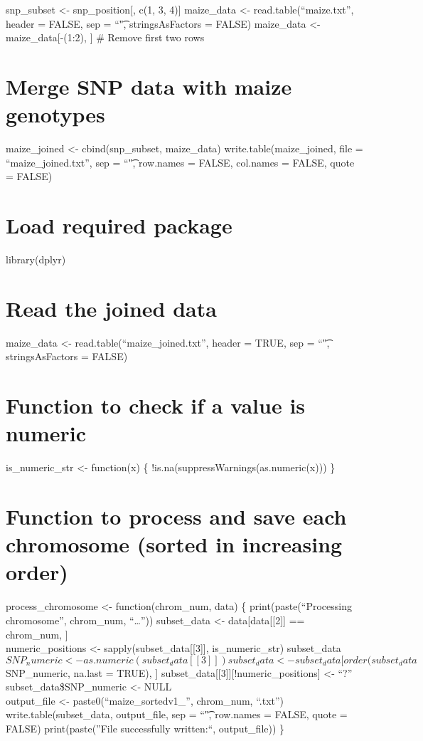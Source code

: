 \documentclass[
]{article}
\begin{document}
snp\_subset \textless- snp\_position{[}, c(1, 3, 4){]} maize\_data
\textless- read.table(``maize.txt'', header = FALSE, sep = ``\t",
stringsAsFactors = FALSE) maize\_data \textless- maize\_data{[}-(1:2),
{]} \# Remove first two rows

\section{Merge SNP data with maize
genotypes}\label{merge-snp-data-with-maize-genotypes}

maize\_joined \textless- cbind(snp\_subset, maize\_data)
write.table(maize\_joined, file = ``maize\_joined.txt'', sep = ``\t",
row.names = FALSE, col.names = FALSE, quote = FALSE)

\section{Load required package}\label{load-required-package}

library(dplyr)

\section{Read the joined data}\label{read-the-joined-data}

maize\_data \textless- read.table(``maize\_joined.txt'', header = TRUE,
sep = ``\t", stringsAsFactors = FALSE)

\section{Function to check if a value is
numeric}\label{function-to-check-if-a-value-is-numeric}

is\_numeric\_str \textless- function(x) \{
!is.na(suppressWarnings(as.numeric(x))) \}

\section{Function to process and save each chromosome (sorted in
increasing
order)}\label{function-to-process-and-save-each-chromosome-sorted-in-increasing-order}

process\_chromosome \textless- function(chrom\_num, data) \{
print(paste(``Processing chromosome'', chrom\_num, ``\ldots{}''))
subset\_data \textless- data{[}data{[}{[}2{]}{]} == chrom\_num, {]}\\
numeric\_positions \textless- sapply(subset\_data{[}{[}3{]}{]},
is\_numeric\_str)
subset\_data\(SNP_numeric <- as.numeric(subset_data[[3]])
  subset_data <- subset_data[order(subset_data\)SNP\_numeric, na.last =
TRUE), {]} subset\_data{[}{[}3{]}{]}{[}!numeric\_positions{]} \textless-
``?'' subset\_data\$SNP\_numeric \textless- NULL\\
output\_file \textless- paste0(``maize\_sortedv1\_'', chrom\_num,
``.txt'') write.table(subset\_data, output\_file, sep = ``\t", row.names
= FALSE, quote = FALSE) print(paste(''File successfully written:``,
output\_file)) \}
\end{document}
